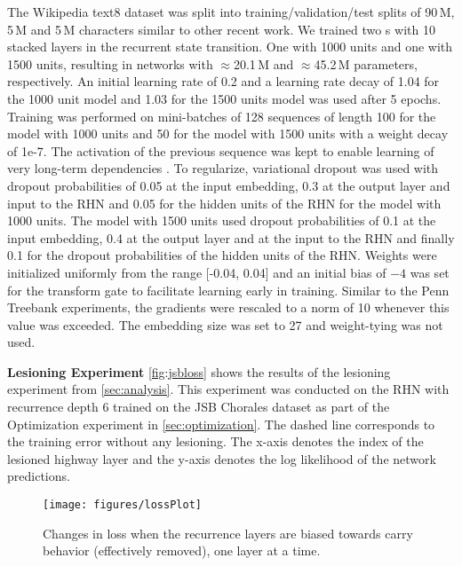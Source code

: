 \documentclass[letterpaper]{article}
\begin{document}
The Wikipedia text8 dataset \citep{hutter_prize} was split into training/validation/test splits of 90\,M, 5\,M and 5\,M characters similar to other recent work.
We trained two \arch{}s with 10 stacked layers in the recurrent state transition. One with 1000 units and one with 1500 units, resulting in networks with $\approx$20.1\,M and $\approx$45.2\,M parameters, respectively. 
An initial learning rate of 0.2 and a learning rate decay of 1.04 for the 1000 unit model and 1.03 for the 1500 units model was used after 5 epochs. 
Training was performed on mini-batches of 128 sequences of length 100 for the model with 1000 units and 50 for the model with 1500 units with a weight decay of 1e-7.
The activation of the previous sequence was kept to enable learning of very long-term dependencies \citep{graves_generating_sequences}. 
To regularize, variational dropout \citep{gal2015} was used with dropout probabilities of 0.05 at the input embedding, 0.3 at the output layer and input to the RHN and 0.05 for the hidden units of the RHN for the model with 1000 units. The model with 1500 units used dropout probabilities of 0.1 at the input embedding, 0.4 at the output layer and at the input to the RHN and finally 0.1 for the dropout probabilities of the hidden units of the RHN.
Weights were initialized uniformly from the range [-0.04, 0.04] and an initial bias of $-4$ was set for the transform gate to facilitate learning early in training. 
Similar to the Penn Treebank experiments, the gradients were rescaled to a norm of 10 whenever this value was exceeded. The embedding size was set to 27 and weight-tying \citep{weight_tying} was not used. 

\textbf{Lesioning Experiment}
\autoref{fig:jsbloss} shows the results of the lesioning experiment from \autoref{sec:analysis}.
This experiment was conducted on the RHN with recurrence depth 6 trained on the JSB Chorales dataset as part of the Optimization experiment in \autoref{sec:optimization}.
The dashed line corresponds to the training error without any lesioning.
The x-axis denotes the index of the lesioned highway layer and the y-axis denotes the log likelihood of the network predictions.

\begin{figure*}[t] \begin{center}         \texttt{[image: figures/lossPlot]}
\caption{Changes in loss when the recurrence layers are biased towards carry behavior (effectively removed), one layer at a time.}
\label{fig:jsbloss}
\end{center}
\end{figure*}
\end{document}
